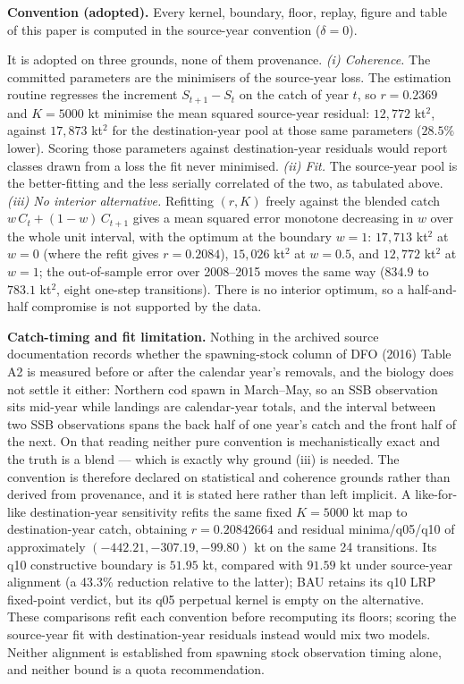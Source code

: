 \documentclass[11pt]{article}
\begin{document}
\textbf{Convention (adopted).} Every kernel, boundary, floor, replay,
figure and table of this paper is computed in the source-year convention
(\(\delta = 0\)).

It is adopted on three grounds, none of them provenance. \emph{(i)
Coherence.} The committed parameters are the minimisers of the
source-year loss. The estimation routine regresses the increment
\(S_{t+1} - S_t\) on the catch of year \(t\), so \(r = 0.2369\) and
\(K = 5000\) kt minimise the mean squared source-year residual:
\(12{,}772\) kt\(^2\), against \(17{,}873\) kt\(^2\) for the
destination-year pool at those same parameters (\(28.5\%\) lower).
Scoring those parameters against destination-year residuals would report
classes drawn from a loss the fit never minimised. \emph{(ii) Fit.} The
source-year pool is the better-fitting and the less serially correlated
of the two, as tabulated above. \emph{(iii) No interior alternative.}
Refitting \((r, K)\) freely against the blended catch
\(w\,C_t + (1-w)\,C_{t+1}\) gives a mean squared error monotone
decreasing in \(w\) over the whole unit interval, with the optimum at the
boundary \(w = 1\): \(17{,}713\) kt\(^2\) at \(w = 0\) (where the refit
gives \(r = 0.2084\)), \(15{,}026\) kt\(^2\) at \(w = 0.5\), and
\(12{,}772\) kt\(^2\) at \(w = 1\); the out-of-sample error over
2008--2015 moves the same way (\(834.9\) to \(783.1\) kt\(^2\), eight
one-step transitions). There is no interior optimum, so a half-and-half
compromise is not supported by the data.

\textbf{Catch-timing and fit limitation.} Nothing in the
archived source documentation records whether the spawning-stock column of
DFO (2016) Table A2 is measured before or after the calendar year's
removals, and the biology does not settle it either: Northern cod spawn in
March--May, so an SSB observation sits mid-year while landings are
calendar-year totals, and the interval between two SSB observations spans
the back half of one year's catch and the front half of the next. On that
reading neither pure convention is mechanistically exact and the truth is
a blend --- which is exactly why ground (iii) is needed. The convention is
therefore declared on statistical and coherence grounds rather than
derived from provenance, and it is stated here rather than left implicit.
A like-for-like destination-year sensitivity refits the same fixed
\(K=5000\) kt map to destination-year catch, obtaining
\(r=0.20842664\) and residual minima/q05/q10 of approximately
\((-442.21,-307.19,-99.80)\) kt on the same 24 transitions. Its q10
constructive boundary is \(51.95\) kt, compared with \(91.59\) kt
under source-year alignment (a 43.3\% reduction relative to the latter);
BAU retains its q10 LRP fixed-point
verdict, but its q05 perpetual kernel is empty on the alternative.
These comparisons refit each convention before recomputing its floors;
scoring the source-year fit with destination-year residuals instead
would mix two models. Neither alignment is established from spawning
stock observation timing alone, and neither bound is a quota
recommendation.
\end{document}
